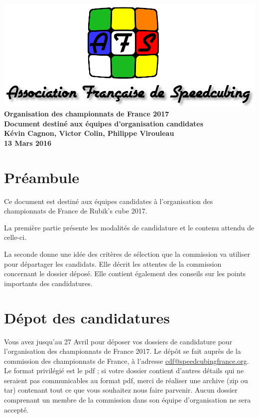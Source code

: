 \documentclass[a4paper,12pt]{scrartcl}
\begin{document}

\begin{titlepage}
    \centering
    \vfill
    \includegraphics[width=\textwidth]{logoafsletters.png}
    \vfill
    {\bfseries\Huge
        Organisation des championnats de France 2017\\
	\large
        Document destiné aux équipes d'organisation candidates\\
        \vskip2cm
        Kévin Cagnon, Victor Colin, Philippe Virouleau\\
        \vskip1cm
	13 Mars 2016
    }    
    \vfill
\end{titlepage}


\pagebreak


\section*{Préambule}

Ce document est destiné aux équipes candidates à l'organisation des championnats de France
de Rubik's cube 2017.

La première partie présente les modalités de candidature et le contenu attendu de celle-ci.

La seconde donne une idée des critères de sélection que la commission va utiliser
pour départager les candidats. Elle décrit les attentes de la commission concernant
le dossier déposé. Elle contient également des conseils sur les points importants des candidatures.


\section*{Dépot des candidatures}

Vous avez jusqu'au 27 Avril pour déposer vos dossiers de candidature pour l'organisation
des championnats de France 2017. Le dépôt se fait auprès de la commission des championnats
de France, à l'adresse \href{mailto:cdf@speedcubingfrance.org}{cdf@speedcubingfrance.org}.
Le format privilégié est le pdf ;
si votre dossier contient d'autres détails qui ne seraient pas communicables au format
pdf, merci de réaliser une archive (zip ou tar) contenant tout ce que vous souhaitez
nous faire parvenir.
Aucun dossier comprenant un membre de la commission dans son équipe d'organisation ne 
sera accepté.
\end{document}
